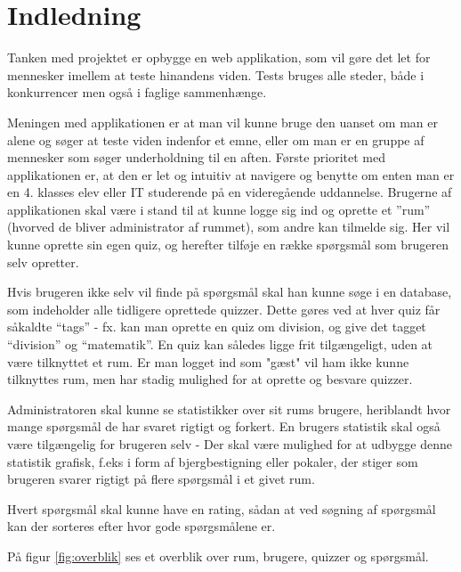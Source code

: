 \chapter{Indledning}
Tanken med projektet er opbygge en web applikation, som vil gøre det let for mennesker imellem at teste hinandens viden. Tests bruges alle steder, både i konkurrencer men også i faglige sammenhænge. 

Meningen med applikationen er at man vil kunne bruge den uanset om man er alene og søger at teste viden indenfor et emne, eller om man er en gruppe af mennesker som søger underholdning til en aften. 
Første prioritet med applikationen er, at den er let og intuitiv at navigere og benytte om enten man er en 4. klasses elev eller IT studerende på en videregående uddannelse. 
Brugerne af applikationen skal være i stand til at kunne logge sig ind og oprette et ''rum'' (hvorved de bliver administrator af rummet), som andre kan tilmelde sig. Her vil kunne oprette sin egen quiz, og herefter tilføje en række spørgsmål som brugeren selv opretter. 

Hvis brugeren ikke selv vil finde på spørgsmål skal han kunne søge i en database, som indeholder alle tidligere oprettede quizzer. Dette gøres ved at hver quiz får såkaldte “tags” - fx. kan man oprette en quiz om division, og give det tagget “division” og “matematik”. En quiz kan således ligge frit tilgængeligt, uden at være tilknyttet et rum. Er man logget ind som "gæst" vil ham ikke kunne tilknyttes rum, men har stadig mulighed for at oprette og besvare quizzer.

Administratoren skal kunne se statistikker over sit rums brugere, heriblandt hvor mange spørgsmål de har svaret rigtigt og forkert. En brugers statistik skal også være tilgængelig for brugeren selv - Der skal være mulighed for at udbygge denne statistik grafisk, f.eks i form af bjergbestigning eller pokaler, der stiger som brugeren svarer rigtigt på flere spørgsmål i et givet rum.

Hvert spørgsmål skal kunne have en rating, sådan at ved søgning af spørgsmål kan der sorteres efter hvor gode spørgsmålene er.

På figur \ref{fig:overblik} ses et overblik over rum, brugere, quizzer og spørgsmål.

